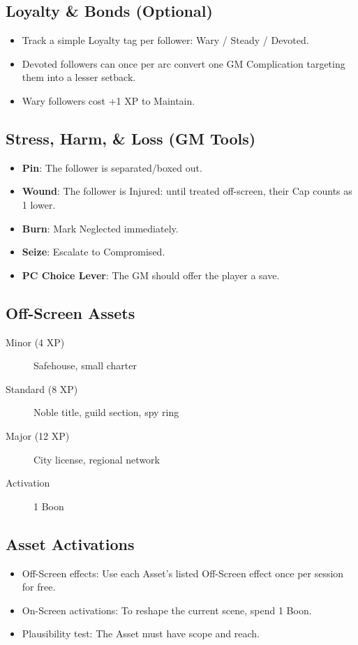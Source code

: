 \subsection{Loyalty \& Bonds (Optional)}
\begin{itemize}
    \item Track a simple Loyalty tag per follower: Wary / Steady / Devoted.
    \item Devoted followers can once per arc convert one GM Complication targeting them into a lesser setback.
    \item Wary followers cost +1 XP to Maintain.
\end{itemize}

\subsection{Stress, Harm, \& Loss (GM Tools)}
\begin{itemize}
    \item \textbf{Pin}: The follower is separated/boxed out.
    \item \textbf{Wound}: The follower is Injured: until treated off-screen, their Cap counts as 1 lower.
    \item \textbf{Burn}: Mark Neglected immediately.
    \item \textbf{Seize}: Escalate to Compromised.
    \item \textbf{PC Choice Lever}: The GM should offer the player a save.
\end{itemize}

\subsection{Off-Screen Assets}

\begin{description}
\item[Minor (4 XP)] Safehouse, small charter
\item[Standard (8 XP)] Noble title, guild section, spy ring
\item[Major (12 XP)] City license, regional network
\item[Activation] 1 Boon
\end{description}

\subsection{Asset Activations}
\begin{itemize}
    \item Off-Screen effects: Use each Asset's listed Off-Screen effect once per session for free.
    \item On-Screen activations: To reshape the current scene, spend 1 Boon.
    \item Plausibility test: The Asset must have scope and reach.
\end{itemize}

